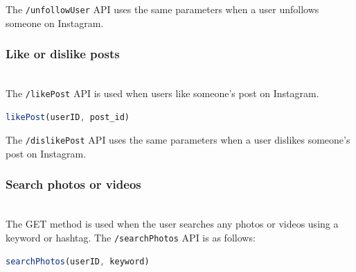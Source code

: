 The \texttt{/unfollowUser} API uses the same parameters when a user unfollows someone on Instagram.

\subsubsection{Like or dislike posts}\label{HWvmHE0hlevk3ZruT2LlA}
\\
The \texttt{/likePost} API is used when users like someone's post on Instagram.

\begin{lstlisting}[language=JavaScript]
likePost(userID, post_id)
\end{lstlisting}

\begin{table}[htbp]
\centering
\small
{}
\end{table}

The \texttt{/dislikePost} API uses the same parameters when a user dislikes someone's post on Instagram.

\subsubsection{Search photos or videos}\label{QoYVkop5EwLWSs59Usoq2}
\\
The GET method is used when the user searches any photos or videos using a keyword or hashtag. The \texttt{/searchPhotos} API is as follows:

\begin{lstlisting}[language=JavaScript]
searchPhotos(userID, keyword)
\end{lstlisting}

\begin{table}[htbp]
\centering
\small
{}
\end{table}

